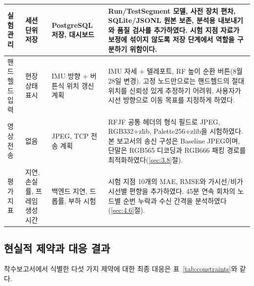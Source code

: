 \documentclass[11pt,a4paper]{article}
\begin{document}
{\begin{longtable}{@{}>{\raggedright\arraybackslash}p{1.7cm}
  >{\raggedright\arraybackslash}p{3.0cm}
  >{\raggedright\arraybackslash}p{3.4cm}
  >{\raggedright\arraybackslash}p{6.5cm}@{}}
\midrule
실험 관리 & 세션 단위 저장 & PostgreSQL 저장, 대시보드 &
Run/TestSegment 모델, 사전 장치 편차, SQLite/JSONL 원본 보존, 분석용 내보내기와 품질 검사를 추가하였다. 시험 지점
자료가 보정에 섞이지 않도록 저장 단계에서 역할을 구분하기 위함이다. \\
\midrule
핸드헬드 입력 & 현장 상태 표시 & IMU 방향 + 버튼식 위치 갱신 계획 &
IMU 자세 + 텔레포트, RF 높이 순환 버튼(8월 28일 변경). 고정 노드만으로는 핸드헬드의 절대 위치를 신뢰성 있게 추정하기
어려워, 사용자가 시선 방향으로 이동 목표를 지정하게 하였다. \\
\midrule
영상 전송 & 없음 & JPEG, TCP 전송 계획 &
RFJF 공통 헤더의 형식 필드로 JPEG, RGB332+zlib, Palette256+zlib을 시험하였다. 본 보고서의 송신 구성은 Baseline
JPEG이며, 단말은 RGB565 디코딩과 RGB666 패킹 경로를 최적화하였다(\ref{sec:3.8}절). \\
\midrule
평가 지표 & 지연, 손실률, 프레임 생성 시간 & 백엔드 지연, 드롭률, 부하 시험 &
시험 지점 10개의 MAE, RMSE와 가시선/비가시선별 편향을 추가하였다. 45분 연속 회차의 노드별 순번 누락과 수신 간격을
분석하였다(\ref{sec:4.6}절). \\
\end{longtable}
}

\subsection{현실적 제약과 대응 결과}
\label{sec:changes-constraints}

착수보고서에서 식별한 다섯 가지 제약에 대한 최종 대응은 표~\ref{tab:constraints}와 같다.
\end{document}
